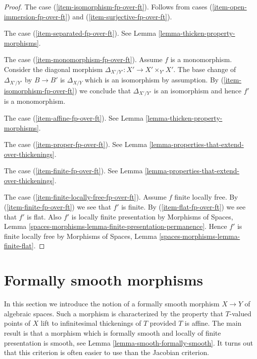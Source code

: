 \begin{proof}
\medskip\noindent
The case (\ref{item-isomorphism-fp-over-ft}). Follows from cases
(\ref{item-open-immersion-fp-over-ft}) and (\ref{item-surjective-fp-over-ft}).

\medskip\noindent
The case (\ref{item-separated-fp-over-ft}). See
Lemma \ref{lemma-thicken-property-morphisms}.

\medskip\noindent
The case (\ref{item-monomorphism-fp-over-ft}). Assume $f$ is a monomorphism.
Consider the diagonal morphism $\Delta_{X'/Y'} : X' \to X' \times_{Y'} X'$.
The base change of $\Delta_{X'/Y'}$ by $B \to B'$ is $\Delta_{X/Y}$
which is an isomorphism by assumption. By (\ref{item-isomorphism-fp-over-ft})
we conclude that $\Delta_{X'/Y'}$ is an isomorphism and hence
$f'$ is a monomorphism.

\medskip\noindent
The case (\ref{item-affine-fp-over-ft}).
See Lemma \ref{lemma-thicken-property-morphisms}.

\medskip\noindent
The case (\ref{item-proper-fp-over-ft}). See
Lemma \ref{lemma-properties-that-extend-over-thickenings}.

\medskip\noindent
The case (\ref{item-finite-fp-over-ft}). See
Lemma \ref{lemma-properties-that-extend-over-thickenings}.

\medskip\noindent
The case (\ref{item-finite-locally-free-fp-over-ft}).
Assume $f$ finite locally free.
By (\ref{item-finite-fp-over-ft}) we see that $f'$ is finite.
By (\ref{item-flat-fp-over-ft}) we see that $f'$ is flat.
Also $f'$ is locally finite presentation by
Morphisms of Spaces, Lemma
\ref{spaces-morphisms-lemma-finite-presentation-permanence}.
Hence $f'$ is finite locally free by
Morphisms of Spaces, Lemma \ref{spaces-morphisms-lemma-finite-flat}.
\end{proof}













\section{Formally smooth morphisms}
\label{section-formally-smooth}

\noindent
In this section we introduce the notion of a formally smooth morphism
$X \to Y$ of algebraic spaces. Such a morphism is
characterized by the property that $T$-valued points of $X$ lift
to infinitesimal thickenings of $T$ provided $T$ is affine.
The main result is that a morphism which is formally smooth and
locally of finite presentation is smooth, see
Lemma \ref{lemma-smooth-formally-smooth}.
It turns out that this criterion is often easier to use than the
Jacobian criterion.

